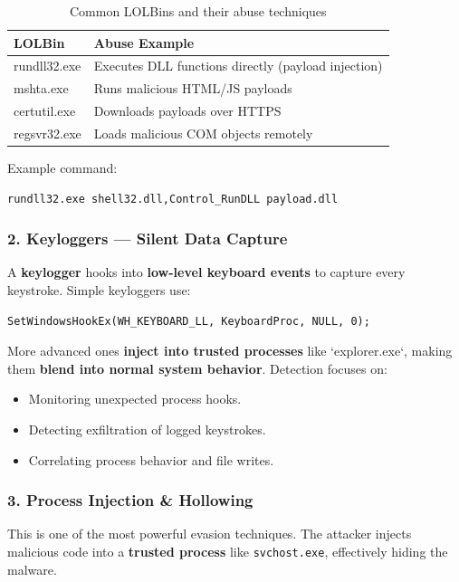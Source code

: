 \begin{table}[H]
    \centering
    \begin{tabular}{|l|l|}
        \hline
        \textbf{LOLBin} & \textbf{Abuse Example} \\
        \hline
        rundll32.exe & Executes DLL functions directly (payload injection) \\
        mshta.exe & Runs malicious HTML/JS payloads \\
        certutil.exe & Downloads payloads over HTTPS \\
        regsvr32.exe & Loads malicious COM objects remotely \\
        \hline
    \end{tabular}
    \caption{Common LOLBins and their abuse techniques}
\end{table}

Example command:
\begin{verbatim}
rundll32.exe shell32.dll,Control_RunDLL payload.dll
\end{verbatim}

\subsubsection{2. Keyloggers — Silent Data Capture}

A \textbf{keylogger} hooks into \textbf{low-level keyboard events} to capture every keystroke. Simple keyloggers use:
\begin{verbatim}
SetWindowsHookEx(WH_KEYBOARD_LL, KeyboardProc, NULL, 0);
\end{verbatim}

More advanced ones \textbf{inject into trusted processes} like `explorer.exe`, making them \textbf{blend into normal system behavior}. Detection focuses on:

\begin{itemize}
    \item Monitoring unexpected process hooks.
    \item Detecting exfiltration of logged keystrokes.
    \item Correlating process behavior and file writes.
\end{itemize}

\subsubsection{3. Process Injection \& Hollowing}

This is one of the most powerful evasion techniques. The attacker injects malicious code into a \textbf{trusted process} like \texttt{svchost.exe}, effectively hiding the malware.

